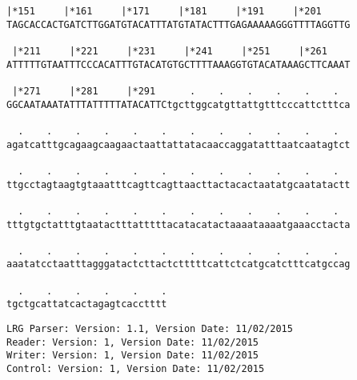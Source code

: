 \documentclass{article}
\begin{document}
\begin{Verbatim}[fontfamily=courier]
 |*151     |*161     |*171     |*181     |*191     |*201    
TAGCACCACTGATCTTGGATGTACATTTATGTATACTTTGAGAAAAAGGGTTTTAGGTTG

 |*211     |*221     |*231     |*241     |*251     |*261    
ATTTTTGTAATTTCCCACATTTGTACATGTGCTTTTAAAGGTGTACATAAAGCTTCAAAT

 |*271     |*281     |*291      .    .    .    .    .    .  
GGCAATAAATATTTATTTTTATACATTCtgcttggcatgttattgtttcccattctttca

  .    .    .    .    .    .    .    .    .    .    .    .  
agatcatttgcagaagcaagaactaattattatacaaccaggatatttaatcaatagtct

  .    .    .    .    .    .    .    .    .    .    .    .  
ttgcctagtaagtgtaaatttcagttcagttaacttactacactaatatgcaatatactt

  .    .    .    .    .    .    .    .    .    .    .    .  
tttgtgctatttgtaatactttatttttacatacatactaaaataaaatgaaacctacta

  .    .    .    .    .    .    .    .    .    .    .    .  
aaatatcctaatttagggatactcttactctttttcattctcatgcatctttcatgccag

  .    .    .    .    .    .
tgctgcattatcactagagtcacctttt
\end{Verbatim}
\newpage
\begin{Verbatim}[fontfamily=courier]
LRG Parser: Version: 1.1, Version Date: 11/02/2015
Reader: Version: 1, Version Date: 11/02/2015
Writer: Version: 1, Version Date: 11/02/2015
Control: Version: 1, Version Date: 11/02/2015
\end{Verbatim}
\end{document}

